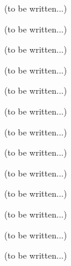 


(to be written...)



(to be written...)



(to be written...)







(to be written...)



(to be written...)



(to be written...)



(to be written...)







(to be written...)



(to be written...)



(to be written...)







(to be written...)



(to be written...)



(to be written...)







